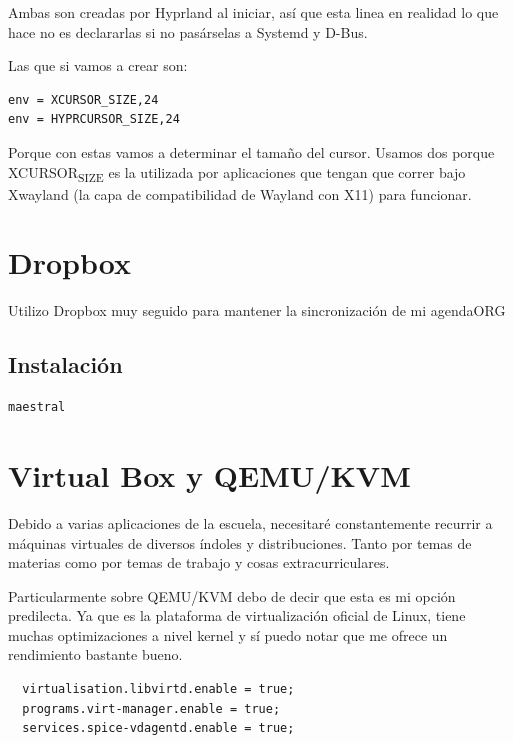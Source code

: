 \documentclass[11pt]{article}
\begin{document}
Ambas son creadas por Hyprland al iniciar, así que esta linea en realidad lo que hace no es declararlas si no pasárselas a Systemd y D-Bus.

Las que si vamos a crear son:

\begin{verbatim}
env = XCURSOR_SIZE,24
env = HYPRCURSOR_SIZE,24
\end{verbatim}

Porque con estas vamos a determinar el tamaño del cursor. Usamos dos porque XCURSOR\textsubscript{SIZE} es la utilizada por aplicaciones que tengan que correr bajo Xwayland (la capa de compatibilidad de Wayland con X11) para funcionar.
\subsubsection{}
\label{sec:org2321158}
\section{Dropbox}
\label{sec:org6bb71ff}

Utilizo Dropbox muy seguido para mantener la sincronización de mi agendaORG
\subsection{Instalación}
\label{sec:orgc438ca3}

\begin{verbatim}
maestral
\end{verbatim}
\section{Virtual Box y QEMU/KVM}
\label{sec:org1b38583}

Debido a varias aplicaciones de la escuela, necesitaré constantemente recurrir a máquinas virtuales de diversos índoles y distribuciones. Tanto por temas de materias como por temas de trabajo y cosas extracurriculares.

Particularmente sobre QEMU/KVM debo de decir que esta es mi opción predilecta. Ya que es la plataforma de virtualización oficial de Linux, tiene muchas optimizaciones a nivel kernel y sí puedo notar que me ofrece un rendimiento bastante bueno.

\begin{verbatim}
  virtualisation.libvirtd.enable = true;
  programs.virt-manager.enable = true;
  services.spice-vdagentd.enable = true;
\end{verbatim}
\end{document}
